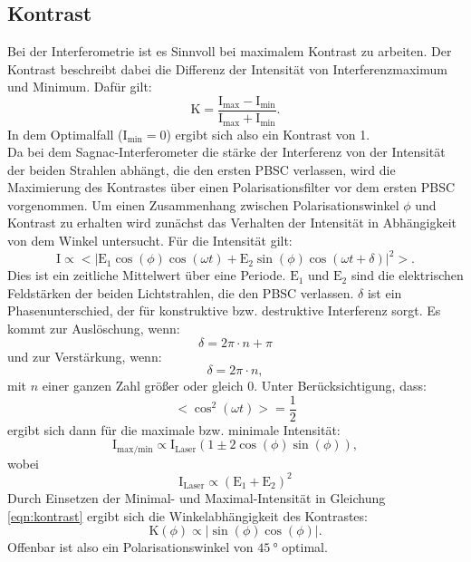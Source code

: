 \documentclass[
  bibliography=totoc,     %
  captions=tableheading,  %
  titlepage=firstiscover, %
]{scrartcl}
\begin{document}
\subsection{Kontrast}
\label{sub:kontrast}
Bei der Interferometrie ist es Sinnvoll bei maximalem Kontrast zu arbeiten.
Der Kontrast beschreibt dabei die Differenz der Intensität von Interferenzmaximum
und Minimum.
Dafür gilt:
\begin{equation}
  \mathup{K} = \frac{\mathup{I_\mathup{max}}-\mathup{I_\mathup{min}}}{\mathup{I_\mathup{max}}+\mathup{I_\mathup{min}}}.
  \label{eqn:kontrast}
\end{equation}
In dem Optimalfall ($\mathup{I_\mathup{min}} = 0$) ergibt sich also ein Kontrast
von 1.\\
Da bei dem Sagnac-Interferometer die stärke der Interferenz von der
Intensität der beiden Strahlen abhängt, die den ersten PBSC verlassen, wird die
Maximierung des Kontrastes über einen Polarisationsfilter vor dem ersten PBSC
vorgenommen. Um einen Zusammenhang zwischen Polarisationswinkel $\phi$ und Kontrast
zu erhalten wird zunächst das Verhalten der Intensität in Abhängigkeit von dem Winkel
untersucht.
Für die Intensität gilt:
\begin{equation}
  \mathup{I} \propto \bigl< \bigl| \mathup{E_1} \cos\left(\phi\right) \cos\left(\omega t\right) + \mathup{E_2} \sin\left(\phi\right) \cos\left(\omega t + \delta\right) \bigr| ^2 \bigr>.
  \label{eqn:intens}
\end{equation}
Dies ist ein zeitliche Mittelwert über eine Periode. $\mathup{E_1}$ und $\mathup{E_2}$
sind die elektrischen Feldstärken der beiden Lichtstrahlen, die den PBSC verlassen.
$\delta$ ist ein Phasenunterschied, der für konstruktive bzw. destruktive Interferenz
sorgt. Es kommt zur Auslöschung, wenn:
\begin{equation*}
  \delta = 2\pi \cdot n + \pi
\end{equation*}
und zur Verstärkung, wenn:
\begin{equation*}
  \delta = 2\pi \cdot n,
\end{equation*}
mit $n$ einer ganzen Zahl größer oder gleich 0.
Unter Berücksichtigung, dass:
\begin{equation*}
  \bigl< \cos^2\left(\omega t \right) \bigr> = \frac{1}{2}
\end{equation*}
ergibt sich dann für die maximale bzw. minimale Intensität:
\begin{equation}
  \mathup{I}_\mathup{max/min} \propto \mathup{I}_\mathup{Laser} \left( 1 \pm 2\cos\left(\phi\right)\sin\left(\phi\right)\right),
  \label{eqn:intensmaxmin}
\end{equation}
wobei
\begin{equation*}
  \mathup{I}_\mathup{Laser} \propto \left(\mathup{E}_1 + \mathup{E}_2\right)^2
\end{equation*}
Durch Einsetzen der Minimal- und Maximal-Intensität in Gleichung \eqref{eqn:kontrast}
ergibt sich die Winkelabhängigkeit des Kontrastes:
\begin{equation}
  \mathup{K}\left(\phi\right) \propto \bigl|\sin\left(\phi\right)\cos\left(\phi\right)\bigr|.
  \label{eqn:kontrastwinkel}
\end{equation}
Offenbar ist also ein Polarisationswinkel von $\SI{45}{\degree}$ optimal.
\end{document}
